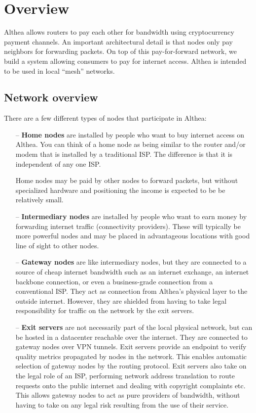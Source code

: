 \documentclass[11pt]{article}
\begin{document}
\tableofcontents

\section{Overview}
\label{sec:overview}
Althea allows routers to pay each other for bandwidth using cryptocurrency payment channels. An important architectural detail is that nodes only pay neighbors for forwarding packets. On top of this pay-for-forward network, we build a system allowing consumers to pay for internet access. Althea is intended to be used in local ``mesh'' \cite{wcn} networks.

\subsection{Network overview}

There are a few different types of nodes that participate in Althea:

\begin{itemize}
\item[--] \textbf{Home nodes} are installed by people who want to buy internet access on Althea. You can think of a home node as being similar to the router and/or modem that is installed by a traditional ISP. The difference is that it is independent of any one ISP.
 
Home nodes may be paid by other nodes to forward packets, but without specialized hardware and positioning the income is expected to be be relatively small.

\item[--] \textbf{Intermediary nodes} are installed by people who want to earn money by forwarding internet traffic (connectivity providers). These will typically be more powerful nodes and may be placed in advantageous locations with good line of sight to other nodes. 

\item[--] \textbf{Gateway nodes} are like intermediary nodes, but they are connected to a source of cheap internet bandwidth such as an internet exchange, an internet backbone connection, or even a business-grade connection from a conventional ISP. They act as connection from Althea’s physical layer to the outside internet. However, they are shielded from having to take legal responsibility for traffic on the network by the exit servers.

\item[--] \textbf{Exit servers} are not necessarily part of the local physical network, but can be hosted in a datacenter reachable over the internet. They are connected to gateway nodes over VPN tunnels. Exit servers provide an endpoint to verify quality metrics propagated by nodes in the network. This enables automatic selection of gateway nodes by the routing protocol. Exit servers also take on the legal role of an ISP, performing network address translation to route requests onto the public internet and dealing with copyright complaints etc. This allows gateway nodes to act as pure providers of bandwidth, without having to take on any legal risk resulting from the use of their service.

\end{itemize}
\end{document}
